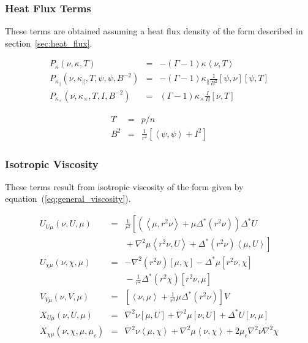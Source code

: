 \documentclass[letterpaper]{book}
\newcommand{\gs}[1]{\Delta^* #1}
\newcommand{\lp}[1]{\nabla^2 #1}
\newcommand{\pb}[2]{\left[#1,#2\right]}
\newcommand{\ip}[2]{\left\langle  #1,#2\right\rangle}
\begin{document}
\subsubsection{Heat Flux Terms}

These terms are obtained assuming a heat flux density of the form
described in section~\ref{sec:heat_flux}.

\begin{equation}
  \begin{array}{lcl}
    P_\kappa(\nu, \kappa, T) & = &
    -(\Gamma - 1) \kappa \ip{\nu}{T}
    \\
    P_{\kappa_\parallel}(\nu, \kappa_\parallel, T, \psi, \psi, B^{-2}) & = &
    -(\Gamma - 1) \kappa_\parallel \frac{1}{B^2} \pb{\psi}{\nu} \pb{\psi}{T}
    \\
    P_{\kappa_\times}(\nu, \kappa_\times, T, I, B^{-2}) & = & 
    (\Gamma - 1) \kappa_\times \frac{I}{B} \pb{\nu}{T}
  \end{array}
\end{equation}

\begin{eqnarray*}
  T & = & p/n \\
  B^2 & = & \frac{1}{r^2} \left[ \ip{\psi}{\psi} + I^2 \right]
\end{eqnarray*}


\subsubsection{Isotropic Viscosity}

These terms result from isotropic viscosity of the form given by
equation~(\ref{eq:general_viscosity}).

\begin{equation}
  \begin{array}{lcl}
    U_{U \mu}(\nu, U, \mu) & = & \frac{1}{r^2} \left [ \left(
      \ip{\mu}{r^2 \nu} + \mu \gs{(r^2 \nu)} \right) \gs{U} \right. \\
      & & \left. \mbox{} + \lp{\mu} \ip{r^2 \nu}{U} 
      + \gs{(r^2 \nu)} \ip{\mu}{U} \right]
    \\
    U_{\chi \mu}(\nu, \chi, \mu) & = & -\lp{(r^2 \nu)} \pb{\mu}{\chi}
      - \gs{\mu}\pb{r^2\nu}{\chi} \\ & & \mbox{}
      - \frac{1}{r^2}\gs{(r^2 \chi)} \pb{r^2 \nu}{\mu}
    \\
    V_{V \mu}(\nu, V, \mu) & = & \left[\ip{\nu}{\mu} 
      + \frac{1}{r^2}\mu \gs{(r^2 \nu)} \right] V
    \\
    X_{U \mu}(\nu, U, \mu) & = & \lp{\nu} \pb{\mu}{U} 
      + \lp{\mu} \pb{\nu}{U} + \gs{U} \pb{\nu}{\mu}
    \\
    X_{\chi \mu}(\nu, \chi, \mu, \mu_c) & = & 
      \lp{\nu} \ip{\mu}{\chi} + \lp{\mu} \ip{\nu}{\chi}
      + 2 \mu_c \lp{\nu} \lp{\chi}
  \end{array}
\end{equation}
\end{document}
